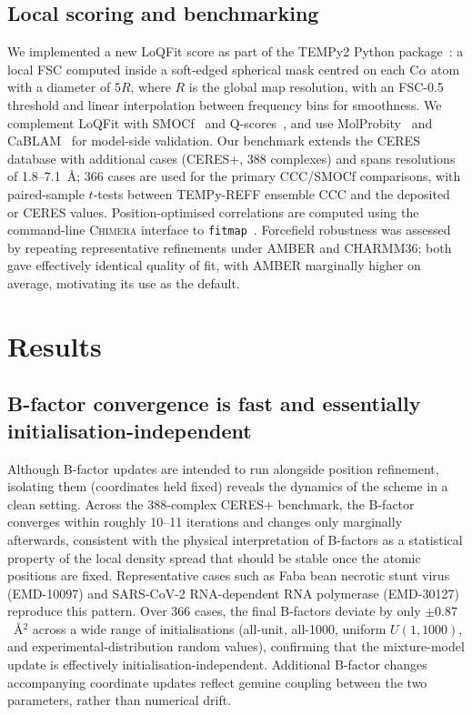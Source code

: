 \documentclass[11pt]{article}
\begin{document}
\subsection{Local scoring and benchmarking}
We implemented a new LoQFit score as part of the TEMPy2 Python package~\cite{farabella2015}: a local FSC computed inside a soft-edged spherical mask centred on each C$\alpha$ atom with a diameter of $5R$, where $R$ is the global map resolution, with an FSC-0.5 threshold and linear interpolation between frequency bins for smoothness. We complement LoQFit with SMOCf~\cite{farabella2015,joseph2017} and Q-scores~\cite{pintilie2020}, and use MolProbity~\cite{williams2018,chen2010} and CaBLAM~\cite{williams2018} for model-side validation. Our benchmark extends the CERES~\cite{liebschner2019} database with additional cases (CERES+, 388 complexes) and spans resolutions of 1.8--7.1~\AA; 366 cases are used for the primary CCC/SMOCf comparisons, with paired-sample $t$-tests between TEMPy-REFF ensemble CCC and the deposited or CERES values. Position-optimised correlations are computed using the command-line \textsc{Chimera} interface to \texttt{fitmap}~\cite{goddard2018,pettersen2021}. Forcefield robustness was assessed by repeating representative refinements under AMBER and CHARMM36; both gave effectively identical quality of fit, with AMBER marginally higher on average, motivating its use as the default.

\section{Results}

\subsection{B-factor convergence is fast and essentially initialisation-independent}
Although B-factor updates are intended to run alongside position refinement, isolating them (coordinates held fixed) reveals the dynamics of the scheme in a clean setting. Across the 388-complex CERES+ benchmark, the B-factor converges within roughly 10--11 iterations and changes only marginally afterwards, consistent with the physical interpretation of B-factors as a statistical property of the local density spread that should be stable once the atomic positions are fixed. Representative cases such as Faba bean necrotic stunt virus (EMD-10097) and SARS-CoV-2 RNA-dependent RNA polymerase (EMD-30127) reproduce this pattern. Over 366 cases, the final B-factors deviate by only $\pm 0.87$~\AA$^{2}$ across a wide range of initialisations (all-unit, all-1000, uniform $U(1,1000)$, and experimental-distribution random values), confirming that the mixture-model update is effectively initialisation-independent. Additional B-factor changes accompanying coordinate updates reflect genuine coupling between the two parameters, rather than numerical drift.
\end{document}
